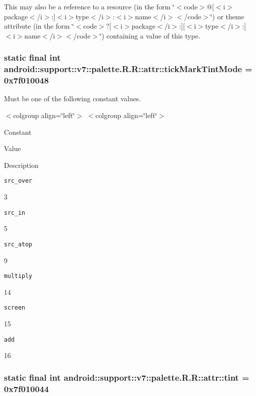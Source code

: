 This may also be a reference to a resource (in the form \char`\"{}$<$code$>$@\mbox{[}$<$i$>$package$<$/i$>$:\mbox{]}$<$i$>$type$<$/i$>$:$<$i$>$name$<$/i$>$$<$/code$>$\char`\"{}) or theme attribute (in the form \char`\"{}$<$code$>$?\mbox{[}$<$i$>$package$<$/i$>$:\mbox{]}\mbox{[}$<$i$>$type$<$/i$>$:\mbox{]}$<$i$>$name$<$/i$>$$<$/code$>$\char`\"{}) containing a value of this type. \hypertarget{classandroid_1_1support_1_1v7_1_1palette_1_1_r_1_1attr_b4d7297245cc06e93414a475c1c196a2}{
\subsubsection[{tickMarkTintMode}]{\setlength{\rightskip}{0pt plus 5cm}static final int android::support::v7::palette.R.R::attr::tickMarkTintMode = 0x7f010048}}
\label{classandroid_1_1support_1_1v7_1_1palette_1_1_r_1_1attr_b4d7297245cc06e93414a475c1c196a2}


Must be one of the following constant values. \begin{TabularC}{0}
\hline
\end{TabularC}
$<$colgroup align=\char`\"{}left\char`\"{}$>$ $<$colgroup align=\char`\"{}left\char`\"{}$>$ 

Constant

Value

Description 

{\tt src\_\-over}

3

{\tt src\_\-in}

5

{\tt src\_\-atop}

9

{\tt multiply}

14

{\tt screen}

15

{\tt add}

16\hypertarget{classandroid_1_1support_1_1v7_1_1palette_1_1_r_1_1attr_998980588dcead504839a8e7b7f066dc}{
\subsubsection[{tint}]{\setlength{\rightskip}{0pt plus 5cm}static final int android::support::v7::palette.R.R::attr::tint = 0x7f010044}}
\label{classandroid_1_1support_1_1v7_1_1palette_1_1_r_1_1attr_998980588dcead504839a8e7b7f066dc}


